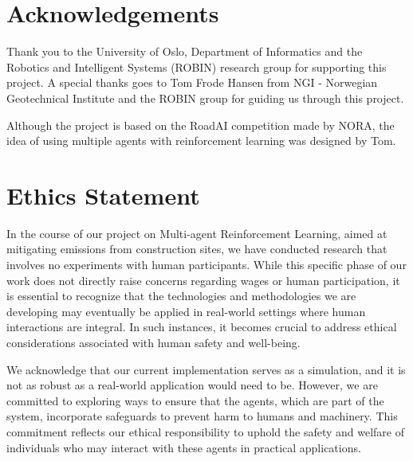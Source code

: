 \documentclass[conference]{IEEEtran}
\begin{document}


\section{Acknowledgements}
Thank you to the University of Oslo, Department of Informatics and the Robotics and
Intelligent Systems (ROBIN) research group for supporting this project. A special thanks goes to
Tom Frode Hansen from NGI - Norwegian Geotechnical Institute and the ROBIN group for guiding us through
this project.

Although the project is based on the RoadAI competition made by NORA, the idea of using multiple
agents with reinforcement learning was designed by Tom.




\section{Ethics Statement}
In the course of our project on Multi-agent Reinforcement Learning, aimed at mitigating \coo{} emissions
from construction sites, we have conducted research that involves no experiments with human participants.
While this specific phase of our work does not directly raise concerns regarding wages or human
participation, it is essential to recognize that the technologies and methodologies we are developing
may eventually be applied in real-world settings where human interactions are integral. In such instances,
it becomes crucial to address ethical considerations associated with human safety and well-being.

We acknowledge that our current implementation serves as a simulation, and it is not as robust as a
real-world application would need to be. However, we are committed to exploring ways to ensure that the
agents, which are part of the system, incorporate safeguards to prevent harm to humans and machinery.
This commitment reflects our ethical responsibility to uphold the safety and welfare of individuals who
may interact with these agents in practical applications.
\end{document}
